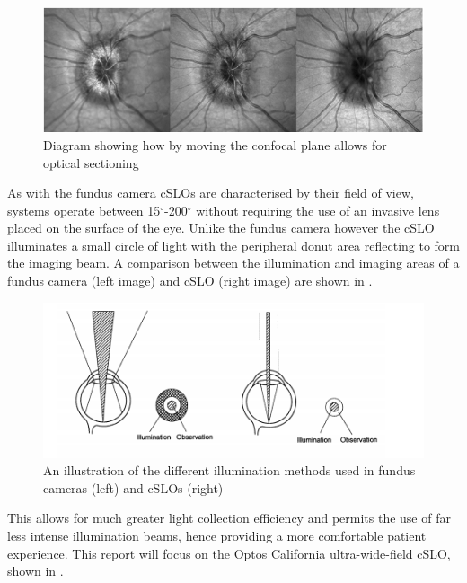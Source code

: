 \begin{figure}[htbp]
\centering
 \includegraphics{figures/confocalimages}
\caption{Diagram showing how by moving the confocal plane allows for optical sectioning}
\label{fig:3dconfocal}
\end{figure}

As with the fundus camera cSLOs are characterised by their field of view, systems operate between 15$^\circ$-200$^\circ$ without requiring the use of an invasive lens placed on the surface of the eye. Unlike the fundus camera however the cSLO illuminates a small circle of light with the peripheral donut area reflecting to form the imaging beam. A comparison between the illumination and imaging areas of a fundus camera (left image) and cSLO (right image) are shown in  .


\begin{figure}[htbp]
\centering
 \includegraphics{figures/illumination}
\caption{An illustration of the different illumination methods used in fundus cameras (left) and cSLOs (right)}
\label{fig:illum}
    \end{figure}


This allows for much greater light collection efficiency and permits the use of far less intense illumination beams, hence providing a more comfortable patient experience. This report will focus on the Optos California ultra-wide-field cSLO, shown in .

